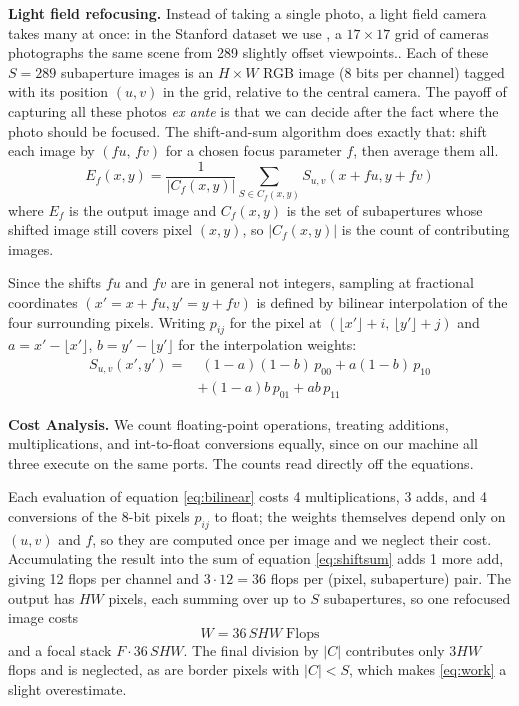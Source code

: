 \documentclass[letterpaper]{article}
\newcommand{\mypar}[1]{{\bf #1.}}
\begin{document}
\mypar{Light field refocusing}
Instead of taking a single photo, a light field camera takes many at once: in the Stanford dataset we use \cite{stanfordlf}, a
$17\times17$ grid of cameras photographs the same scene from 289
slightly offset viewpoints.. Each of these $S=289$ subaperture images is an $H\times W$ RGB image (8 bits per channel) tagged with its position $(u,v)$ in the grid, relative to the central camera. The payoff of capturing all these photos \emph{ex ante} is that we can decide after the fact where the photo should be focused. The shift-and-sum algorithm does exactly that: shift each image by $(f u,\, f v)$ for a chosen focus parameter $f$, then average them all.
\begin{equation}\label{eq:shiftsum}
E_f(x,y) = \frac{1}{|C_f(x,y)|}
\sum_{S \in C_f(x,y)} S_{u,v}(x + f u, y + f v)
\end{equation}
where $E_f$ is the output image and $C_f(x,y)$ is the set of subapertures whose shifted image still covers pixel $(x,y)$, so $|C_f(x,y)|$ is the count of contributing images.

Since the shifts $fu$ and $fv$ are in general not integers, sampling at fractional coordinates $(x' = x + fu, y' = y + fv)$ is defined by bilinear interpolation of the four surrounding pixels. Writing $p_{ij}$ for the pixel at $(\lfloor x' \rfloor{+}i,\, \lfloor y' \rfloor{+}j)$ and $a = x' - \lfloor x' \rfloor$, $b = y' - \lfloor y' \rfloor$ for the interpolation weights:
\begin{equation}\label{eq:bilinear}
\begin{split}
S_{u,v}(x',y') = & \; (1{-}a)(1{-}b)\,p_{00} + a(1{-}b)\,p_{10} \\
               &+ (1{-}a)b\,p_{01} + ab\,p_{11}
\end{split}
\end{equation}

\mypar{Cost Analysis}
We count floating-point operations, treating additions, multiplications, and int-to-float conversions equally, since on our machine all three execute on the same ports. The counts read directly off the equations.

Each evaluation of equation \eqref{eq:bilinear} costs 4 multiplications, 3 adds, and 4 conversions of the 8-bit pixels $p_{ij}$ to float; the weights themselves depend only on $(u,v)$ and $f$, so they are computed once per image and we neglect their cost. Accumulating the result into the sum of equation \eqref{eq:shiftsum} adds 1 more add, giving 12 flops per channel and $3 \cdot 12 = 36$ flops per (pixel, subaperture) pair. The output has $HW$ pixels, each summing over up to $S$ subapertures, so one refocused image costs
\begin{equation}\label{eq:work}
W = 36\,SHW \;\text{Flops}
\end{equation}
and a focal stack $F \cdot 36\,SHW$. The final division by $|C|$ contributes only $3HW$ flops and is neglected, as are border pixels with $|C| < S$, which makes \eqref{eq:work} a slight overestimate.
\end{document}
